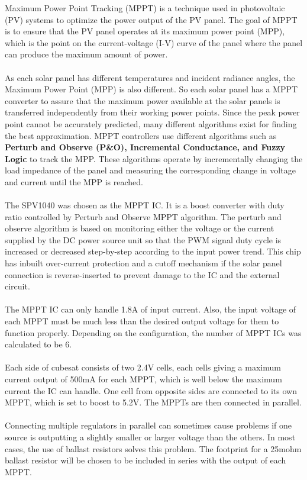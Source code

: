 Maximum Power Point Tracking (MPPT) is a technique used in photovoltaic (PV) systems to optimize the power output of the PV panel. The goal of MPPT is to ensure that the PV panel operates at its maximum power point (MPP), which is the point on the current-voltage (I-V) curve of the panel where the panel can produce the maximum amount of power.
\\ \\
As each solar panel has different temperatures and incident radiance angles, the
Maximum Power Point (MPP) is also different. So each solar panel has a MPPT
converter to assure that the maximum power available at the solar panels is
transferred independently from their working power points. Since the peak power
point cannot be accurately predicted, many different algorithms exist for finding
the best approximation. MPPT controllers use different algorithms such as {\bf Perturb and Observe (P\&O), Incremental Conductance, and Fuzzy Logic} to track the MPP. These algorithms operate by incrementally changing the load impedance of the panel and measuring the corresponding change in voltage and current until the MPP is reached.
\\ \\
The SPV1040 was chosen as the MPPT IC. It is a boost converter with duty ratio controlled by Perturb and Observe MPPT algorithm. The perturb and observe algorithm is based on monitoring either the voltage or the current supplied by the DC power source unit so that the PWM signal duty cycle is increased or decreased step-by-step according to the input power trend. This chip has inbuilt over-current protection and a cutoff mechanism if the solar panel connection is reverse-inserted to prevent damage to the IC and the external circuit.
\\ \\
The MPPT IC can only handle 1.8A of input current. Also, the input voltage of each MPPT must be much less than the desired output voltage for them to function properly. Depending on the configuration, the number of MPPT ICs was calculated to be 6.
\\ \\
Each side of cubesat consists of two 2.4V cells, each cells giving a maximum current output of 500mA for each MPPT, which is well below the maximum current the IC can handle. One cell from opposite sides are connected to its own MPPT, which is set to boost to 5.2V. The MPPTs are then connected in parallel.
\\ \\
Connecting multiple regulators in parallel can sometimes cause problems if one source is outputting a slightly smaller or larger voltage than the others. In most cases, the use of ballast resistors solves this problem. The footprint for a 25mohm ballast resistor will be chosen to be included in series with the output of each MPPT.\\



